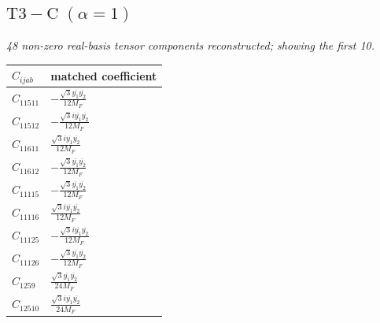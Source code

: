 \documentclass[9pt]{article}
\begin{document}
\subsection*{$ \mathrm{T3-C}\;(\alpha=1) $}
\textit{48 non-zero real-basis tensor components reconstructed; showing the first 10.}
\begin{longtable}{@{}ll@{}}
\toprule
$C_{ijab}$ & matched coefficient \\
\midrule
$C_{11511}$ & $ - \frac{\sqrt{3} \overline{y_{1}} \overline{y_{2}}}{12 M_F} $ \\
$C_{11512}$ & $ - \frac{\sqrt{3} i \overline{y_{1}} \overline{y_{2}}}{12 M_F} $ \\
$C_{11611}$ & $ \frac{\sqrt{3} i \overline{y_{1}} \overline{y_{2}}}{12 M_F} $ \\
$C_{11612}$ & $ - \frac{\sqrt{3} \overline{y_{1}} \overline{y_{2}}}{12 M_F} $ \\
$C_{11115}$ & $ - \frac{\sqrt{3} \overline{y_{1}} \overline{y_{2}}}{12 M_F} $ \\
$C_{11116}$ & $ \frac{\sqrt{3} i \overline{y_{1}} \overline{y_{2}}}{12 M_F} $ \\
$C_{11125}$ & $ - \frac{\sqrt{3} i \overline{y_{1}} \overline{y_{2}}}{12 M_F} $ \\
$C_{11126}$ & $ - \frac{\sqrt{3} \overline{y_{1}} \overline{y_{2}}}{12 M_F} $ \\
$C_{1259}$ & $ \frac{\sqrt{3} \overline{y_{1}} \overline{y_{2}}}{24 M_F} $ \\
$C_{12510}$ & $ \frac{\sqrt{3} i \overline{y_{1}} \overline{y_{2}}}{24 M_F} $ \\
\bottomrule
\end{longtable}
\end{document}
